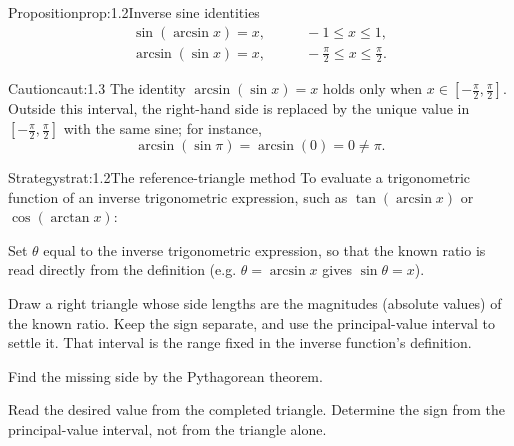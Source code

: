 \documentclass[a4paper,12pt,oneside]{memoir}
\begin{document}
\begin{envproposition}{Proposition}{prop:1.2}{Inverse sine identities}
\[ \begin{aligned} \sin(\arcsin x) = x, &\qquad -1 \le x \le 1,\\ \arcsin(\sin x) = x, &\qquad -\tfrac{\pi}{2} \le x \le \tfrac{\pi}{2}. \end{aligned} \]
\end{envproposition}
\begin{envcaution}{Caution}{caut:1.3}{}
The identity \(\arcsin(\sin x) = x\) holds only when \(x \in \left[-\tfrac{\pi}{2}, \tfrac{\pi}{2}\right]\). Outside this interval, the right-hand side is replaced by the unique value in \(\left[-\tfrac{\pi}{2}, \tfrac{\pi}{2}\right]\) with the same sine; for instance, \[ \arcsin(\sin \pi) = \arcsin(0) = 0 \neq \pi. \]
\end{envcaution}
\begin{envstrategy}{Strategy}{strat:1.2}{The reference-triangle method}
To evaluate a trigonometric function of an inverse trigonometric expression, such as \(\tan(\arcsin x)\) or \(\cos(\arctan x)\):

\begin{steps}
  \item Set \(\theta\) equal to the inverse trigonometric expression, so that the known ratio is read directly from the definition (e.g. \(\theta = \arcsin x\) gives \(\sin\theta = x\)).
  \item Draw a right triangle whose side lengths are the magnitudes (absolute values) of the known ratio. Keep the sign separate, and use the principal-value interval to settle it. That interval is the range fixed in the inverse function’s definition.
  \item Find the missing side by the Pythagorean theorem.
  \item Read the desired value from the completed triangle. Determine the sign from the principal-value interval, not from the triangle alone.
\end{steps}
\end{envstrategy}
\end{document}
